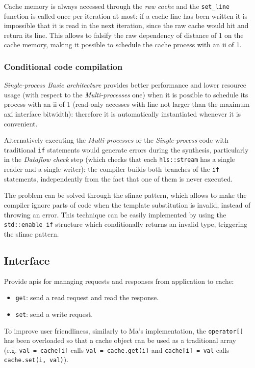 \documentclass[11pt,a4paper,oneside]{memoir}
\begin{document}
Cache memory is always accessed through the \emph{\ac{raw} cache} and the
\texttt{set\_line} function is called once per iteration at most: if a cache
line has been written it is impossible that it is read in the next iteration,
since the \ac{raw} cache would hit and return its line. This allows to falsify
the \ac{raw} dependency of distance of 1 on the cache memory, making it
possible to schedule the cache process with an \ac{ii} of 1.

\subsubsection{Conditional code compilation}
\emph{Single-process Basic architecture} provides better performance and lower
resource usage (with respect to the \emph{Multi-processes} one) when it is
possible to schedule its process with an \ac{ii} of 1 (read-only accesses with
line not larger than the maximum \ac{axi} interface bitwidth): therefore it is
automatically instantiated whenever it is convenient.

Alternatively executing the \emph{Multi-processes} or the \emph{Single-process}
code with traditional \texttt{if} statements would generate errors during the
synthesis, particularly in the \emph{Dataflow check} step (which checks that
each \texttt{hls::stream} has a single reader and a single writer): the
compiler builds both branches of the \texttt{if} statements, independently from
the fact that one of them is never executed.

The problem can be solved through the \ac{sfinae} pattern, which allows to make
the compiler ignore parts of code when the template substitution is invalid,
instead of throwing an error.
This technique can be easily implemented by using the \texttt{std::enable\_if}
structure which conditionally returns an invalid type, triggering the
\ac{sfinae} pattern.

\subsection{Interface}
Provide \acsp{api} for managing requests and responses from application to
cache:
\begin{itemize}
	\item \texttt{get}: send a read request and read the response.
	\item \texttt{set}: send a write request.
\end{itemize}
To improve user friendliness, similarly to Ma's implementation, the
\texttt{operator[]} has been overloaded so that a cache object can be used as a
traditional array (e.g. \texttt{val~=~cache[i]} calls
\texttt{val~=~cache.get(i)} and \texttt{cache[i]~=~val} calls
\texttt{cache.set(i,~val)}).
\end{document}
